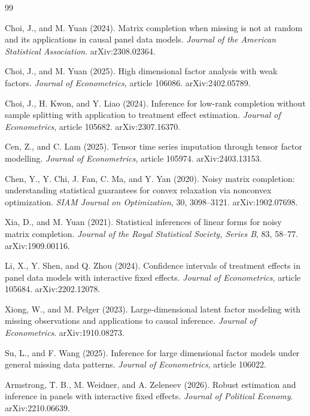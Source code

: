 \documentclass{article}
\begin{document}
\begin{thebibliography}{99}

   Choi, J., and M. Yuan (2024). Matrix completion when missing is not at random and its applications in causal panel data models. \emph{Journal of the American Statistical Association}. arXiv:2308.02364.

   Choi, J., and M. Yuan (2025). High dimensional factor analysis with weak factors. \emph{Journal of Econometrics}, article 106086. arXiv:2402.05789.

   Choi, J., H. Kwon, and Y. Liao (2024). Inference for low-rank completion without sample splitting with application to treatment effect estimation. \emph{Journal of Econometrics}, article 105682. arXiv:2307.16370.

   Cen, Z., and C. Lam (2025). Tensor time series imputation through tensor factor modelling. \emph{Journal of Econometrics}, article 105974. arXiv:2403.13153.

   Chen, Y., Y. Chi, J. Fan, C. Ma, and Y. Yan (2020). Noisy matrix completion: understanding statistical guarantees for convex relaxation via nonconvex optimization. \emph{SIAM Journal on Optimization}, 30, 3098--3121. arXiv:1902.07698.

   Xia, D., and M. Yuan (2021). Statistical inferences of linear forms for noisy matrix completion. \emph{Journal of the Royal Statistical Society, Series B}, 83, 58--77. arXiv:1909.00116.

   Li, X., Y. Shen, and Q. Zhou (2024). Confidence intervals of treatment effects in panel data models with interactive fixed effects. \emph{Journal of Econometrics}, article 105684. arXiv:2202.12078.

   Xiong, W., and M. Pelger (2023). Large-dimensional latent factor modeling with missing observations and applications to causal inference. \emph{Journal of Econometrics}. arXiv:1910.08273.

   Su, L., and F. Wang (2025). Inference for large dimensional factor models under general missing data patterns. \emph{Journal of Econometrics}, article 106022.

   Armstrong, T. B., M. Weidner, and A. Zeleneev (2026). Robust estimation and inference in panels with interactive fixed effects. \emph{Journal of Political Economy}. arXiv:2210.06639.


\end{thebibliography}
\end{document}
